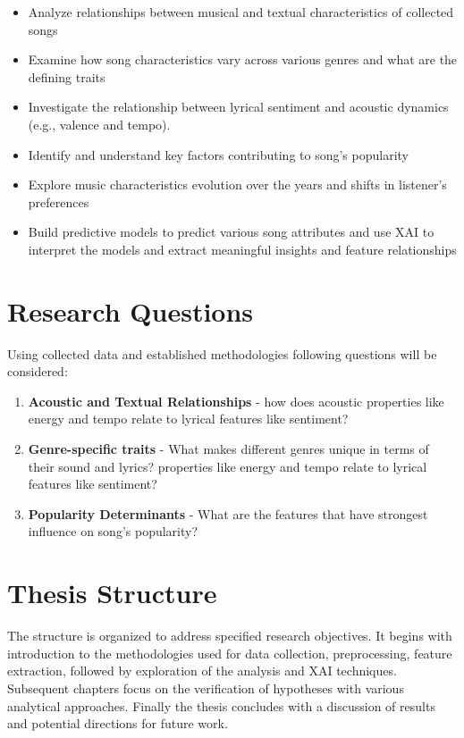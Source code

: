 \begin{itemize} 
  \item Analyze relationships between musical and textual characteristics of
    collected songs
  \item Examine how song characteristics vary across various genres and what are the defining traits
  \item Investigate the relationship between lyrical sentiment and acoustic
    dynamics (e.g., valence and tempo).
  \item Identify and understand key factors contributing to song's popularity
  \item Explore music characteristics evolution over the years and shifts in listener's preferences
  \item Build predictive models to predict various song attributes and use XAI
    to interpret the models and extract meaningful insights and feature
    relationships
\end{itemize}


\section{Research Questions}
\label{sec:researchquestions}
Using collected data and established methodologies following questions will be
considered:

\begin{enumerate}
  \item \textbf{Acoustic and Textual Relationships} - how does acoustic
    properties like energy and tempo relate to lyrical features like sentiment?
  \item \textbf{Genre-specific traits} - What makes different genres unique in terms of their sound and lyrics?
    properties like energy and tempo relate to lyrical features like sentiment?
  \item \textbf{Popularity Determinants} - What are the features that have
    strongest influence on song's popularity?
\end{enumerate}



\section{Thesis Structure}
\label{sec:thesisstructure}

The structure is organized to address specified research objectives. It begins
with introduction to the methodologies used for data collection, preprocessing,
feature extraction, followed by exploration of the analysis and XAI techniques.
Subsequent chapters focus on the verification of hypotheses with various
analytical approaches. Finally the thesis concludes with a discussion of
results and potential directions for future work.

